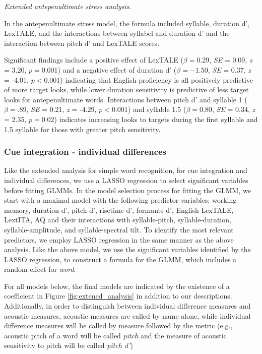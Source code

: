 \textit{Extended antepenultimate stress analysis}.

In the antepenultimate stress model, the formula included syllable, duration d', LexTALE, and the interactions between syllabel and duration d' and the interaction between pitch d' and LexTALE scores. 

Significant findings include a positive effect of LexTALE ($\beta= 0.29$, \textit{SE} = 0.09, \textit{z} = 3.20, $p = 0.001$) and a negative effect of duration d' ($\beta= -1.50$, \textit{SE} = 0.37, \textit{z} = -4.01, $p < 0.001$) indicating that English proficiency is all positively predictive of more target looks, while lower duration sensitivity is predictive of less target looks for antepenultimate words. Interactions between pitch d' and syllable 1 ($\beta= .89$, \textit{SE} = 0.21, \textit{z} = -4.29, $p < 0.001$) and syllable 1.5 ($\beta= 0.80$, \textit{SE} = 0.34, \textit{z} = 2.35, $p = 0.02$) indicates increasing looks to targets during the first syllable and 1.5 syllable for those with greater pitch sensitivity.

\subsubsection{Cue integration - individual differences}

Like the extended analysis for simple word recognition, for cue integration and individual differences, we use a LASSO regression to select significant variables before fitting GLMMs. In the model selection process for fitting the GLMM, we start with a maximal model with the following predictor variables: working memory, duration d', pitch d', risetime d', formants d', English LexTALE, LextITA, AQ and their interactions with syllable-pitch, syllable-duration, syllable-amplitude, and syllable-spectral tilt. To identify the most relevant predictors, we employ LASSO regression in the same manner as the above analysis. Like the above model, we use the significant variables identified by the LASSO regression, to construct a formula for the GLMM, which includes a random effect for \textit{word}.

For all models below, the final models are indicated by the existence of a coefficient in Figure \ref{fig:extened_analysis} in addition to our descriptions. Additionally, in order to distinguish between individual difference measures and acoustic measures, acoustic measures are called by name alone, while individual difference measures will be called by measure followed by the metric (e.g., acoustic pitch of a word will be called \textit{pitch} and the measure of acoustic sensitivity to pitch will be called \textit{pitch d'}) 

